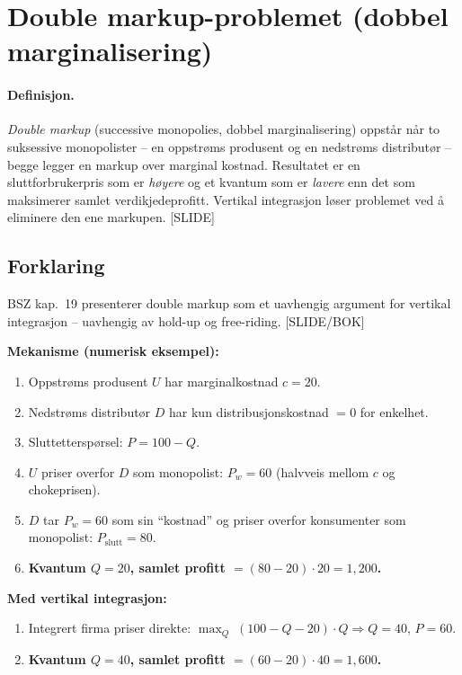 \section{Double markup-problemet (dobbel marginalisering)}\label{thr:double-markup-problem}

\paragraph{Definisjon.} \emph{Double markup} (successive monopolies, dobbel marginalisering) oppstår når to suksessive monopolister -- en oppstrøms produsent og en nedstrøms distributør -- begge legger en markup over marginal kostnad. Resultatet er en sluttforbrukerpris som er \emph{høyere} og et kvantum som er \emph{lavere} enn det som maksimerer samlet verdikjedeprofitt. Vertikal integrasjon løser problemet ved å eliminere den ene markupen. [SLIDE]

\subsection*{Forklaring}

BSZ kap.\ 19 presenterer double markup som et uavhengig argument for vertikal integrasjon -- uavhengig av hold-up og free-riding. [SLIDE/BOK]

\textbf{Mekanisme (numerisk eksempel):}
\begin{enumerate}\setlength{\itemsep}{2pt}
\item Oppstrøms produsent $U$ har marginalkostnad $c=20$.
\item Nedstrøms distributør $D$ har kun distribusjonskostnad $=0$ for enkelhet.
\item Sluttetterspørsel: $P = 100 - Q$.
\item $U$ priser overfor $D$ som monopolist: $P_w = 60$ (halvveis mellom $c$ og chokeprisen).
\item $D$ tar $P_w=60$ som sin ``kostnad'' og priser overfor konsumenter som monopolist: $P_{\text{slutt}} = 80$.
\item \textbf{Kvantum $Q=20$, samlet profitt $= (80-20)\cdot 20 = 1{,}200$.}
\end{enumerate}

\textbf{Med vertikal integrasjon:}
\begin{enumerate}\setlength{\itemsep}{2pt}
\item Integrert firma priser direkte: $\max_{Q}\;(100-Q-20)\cdot Q \Rightarrow Q=40$, $P=60$.
\item \textbf{Kvantum $Q=40$, samlet profitt $= (60-20)\cdot 40 = 1{,}600$.}
\end{enumerate}

